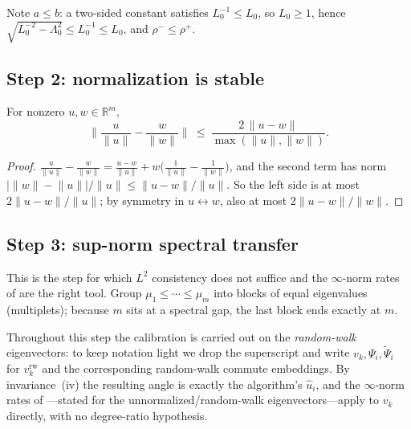 \documentclass[review,supplement]{siamart220329}
\begin{document}
Note $a\le b$: a two-sided constant satisfies $L_0^{-1}\le L_0$, so $L_0\ge1$,
hence $\sqrt{L_0^{-2}-\Lambda_0^2}\le L_0^{-1}\le L_0$, and $\rho^-\le\rho^+$.

\subsection*{Step 2: normalization is stable}
\begin{lemma}\label{lem:normstab}
For nonzero $u,w\in\mathbb{R}^m$,
\[
\Big\lVert \frac{u}{\lVert u\rVert}-\frac{w}{\lVert w\rVert}\Big\rVert
\ \le\ \frac{2\,\lVert u-w\rVert}{\max(\lVert u\rVert,\lVert w\rVert)}.
\]
\end{lemma}
\begin{proof}
$\frac{u}{\lVert u\rVert}-\frac{w}{\lVert w\rVert}
=\frac{u-w}{\lVert u\rVert}
+w\Big(\frac{1}{\lVert u\rVert}-\frac{1}{\lVert w\rVert}\Big)$, and the second
term has norm $\big|\lVert w\rVert-\lVert u\rVert\big|/\lVert u\rVert
\le\lVert u-w\rVert/\lVert u\rVert$. So the left side is at most
$2\lVert u-w\rVert/\lVert u\rVert$; by symmetry in $u\leftrightarrow w$, also at
most $2\lVert u-w\rVert/\lVert w\rVert$.
\end{proof}

\subsection*{Step 3: sup-norm spectral transfer}
This is the step for which $L^2$ consistency \cite{garciatrillos2018} does not
suffice and the $\infty$-norm rates of \cite{calder2022} are the right tool.
Group $\mu_1\le\cdots\le\mu_m$ into blocks of equal eigenvalues (multiplets);
because $m$ sits at a spectral gap, the last block ends exactly at $m$.

\smallskip\noindent Throughout this step the calibration is carried out on the
\emph{random-walk} eigenvectors: to keep notation light we drop the superscript
and write $v_k,\Psi_i,\widetilde\Psi_i$ for $v^{\mathrm{rw}}_k$ and the
corresponding random-walk commute embeddings. By invariance~(iv) the resulting
angle is exactly the algorithm's $\hat u_i$, and the $\infty$-norm rates of
\cite{calder2022}---stated for the unnormalized/random-walk eigenvectors---apply
to $v_k$ directly, with no degree-ratio hypothesis.
\end{document}
